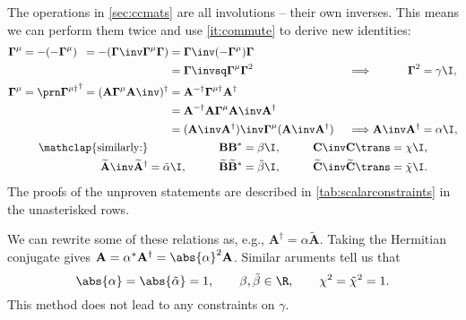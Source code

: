 \documentclass[11pt]{article}
\newcommand{\invd}{^{-\dag}}
\newcommand{\cc}{^\ast}
\newcommand{\hc}{^\dag}
\newcommand{\Gammab}{\boldsymbol{\Gamma}}
\newcommand{\mud}{{\mu\dag}}
\newcommand{\A}{\mathbf{A}}
\newcommand{\B}{\mathbf{B}}
\renewcommand{\C}{\mathbf{C}}
\newcommand{\At}{\widetilde{\A}}
\newcommand{\Bt}{\widetilde{\B}}
\newcommand{\Ct}{\widetilde{\C}}
\newcommand{\alphat}{\tilde{\alpha}}
\newcommand{\betat}{\tilde{\beta}}
\newcommand{\chit}{\tilde{\chi}}
\begin{document}
The operations in \cref{sec:ccmats} are all involutions -- their own inverses.
This means we can perform them twice and use \cref{it:commute} to derive new identities:
%
\begin{equation*}
\begin{gathered}
\begin{alignedat}{5}
  \Gammab^\mu &= -(-\Gammab^\mu) &
        &= -(\Gammab\inv \Gammab^\mu \Gammab) &
        &= \Gammab\inv (-\Gammab^\mu) \Gammab \\ && &&
        &= \Gammab\invsq \Gammab^\mu \Gammab^2 &\quad
  &\implies &
  \Gammab^2 &= \gamma \I, \\
  \Gammab^\mu &= \Gammap[\mud]\hc &
        &= (\A \Gammab^\mu \A\inv)\hc &
        &= \A\invd \Gammab^\mud \A\hc \\ && &&
        &= \A\invd \A \Gammab^\mu \A\inv \A\hc \\ && &&
        &= (\A\inv \A\hc)\inv \Gammab^\mu (\A\inv \A\hc) &
  &\implies &
  \A\inv \A\hc &= \alpha \I,
\end{alignedat} \\
\begin{aligned}
  \mathclap{\text{similarly:}} &&\qquad
  \B \B\cc &= \beta \I, &\qquad
  \C\inv \C\trans &= \chi \I, \\
  \At\inv \At\hc &= \alphat \I, &
  \Bt \Bt\cc &= \betat \I, &
  \Ct\inv \Ct\trans &= \chit \I.
\end{aligned}
\end{gathered}
\end{equation*}
%
The proofs of the unproven statements are described in \cref{tab:scalarconstraints} in the unasterisked rows.

We can rewrite some of these relations as, e.g., \(\A\hc = \alpha \At\).
Taking the Hermitian conjugate gives \(\A = \alpha\cc \A\hc = \abs{\alpha}^2 \A\).
Similar aruments tell us that
%
\begin{equation}\label{eq:constinvol}
  \abs{\alpha} = \abs{\alphat} = 1, \qquad
  \beta, \betat \in \R, \qquad
  \chi^2 = \chit^2 = 1.
\end{equation}
%
This method does not lead to any constraints on \(\gamma\).
\end{document}
